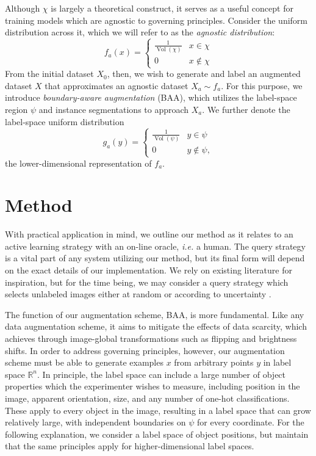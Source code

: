 \documentclass[10pt, journal]{IEEEtran}
\DeclareMathOperator{\vol}{Vol}
\begin{document}
Although $\chi$ is largely a theoretical construct, it serves as a useful
concept for training models which are agnostic to governing principles. Consider
the uniform distribution across it, which we will refer to as the \emph{agnostic
  distribution}:
\[ f_a(x) =
  \begin{cases}
    \frac{1}{\vol(\chi)} & x \in \chi \\
    0 & x \not\in \chi
  \end{cases}
\] From the initial dataset $X_0$, then, we wish to generate and label an
augmented dataset $X$ that approximates an agnostic dataset $X_a \sim f_a$. For
this purpose, we introduce \emph{boundary-aware augmentation} (BAA), which
utilizes the label-space region $\psi$ and instance segmentations to approach
$X_a$. We further denote the label-space uniform distribution
\[ g_a(y) =
  \begin{cases}
    \frac{1}{\vol(\psi)} & y \in \psi \\
    0 & y \not\in \psi,
  \end{cases}
\] the lower-dimensional representation of $f_a$.


\section{Method}
\label{sec:method}

With practical application in mind, we outline our method as it relates to an
active learning strategy with an on-line oracle, \emph{i.e.} a human. The query
strategy is a vital part of any system utilizing our method, but its final form
will depend on the exact details of our implementation. We rely on existing
literature for inspiration, but for the time being, we may consider a query
strategy which selects unlabeled images either at random or according to
uncertainty \cite{settles_active_2012, vezhnevets_active_2012}.

The function of our augmentation scheme, BAA, is more fundamental. Like any data
augmentation scheme, it aims to mitigate the effects of data scarcity, which
\cite{krizhevsky_imagenet_2012} achieves through image-global transformations
such as flipping and brightness shifts. In order to address governing
principles, however, our augmentation scheme must be able to generate examples
$x$ from arbitrary points $y$ in label space $\mathbb{R}^n$. In principle, the
label space can include a large number of object properties which the
experimenter wishes to measure, including position in the image, apparent
orientation, size, and any number of one-hot classifications. These apply to
every object in the image, resulting in a label space that can grow relatively
large, with independent boundaries on $\psi$ for every coordinate. For the
following explanation, we consider a label space of object positions, but
maintain that the same principles apply for higher-dimensional label spaces.
\end{document}
